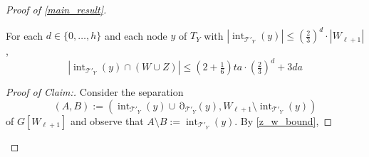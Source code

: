 \documentclass{patmorin}
\newenvironment{clmproof}{\begin{proof}[Proof of Claim:]\renewcommand{\qedsymbol}{\rule{1ex}{1ex}}}{\end{proof}}
\DeclareMathOperator{\interior}{int}
\DeclareMathOperator{\boundary}{\partial}
\begin{document}
\begin{proof}[Proof of \cref{main_result}]
  \begin{clm} \label{cell_bound}
     For each $d\in\{0,\ldots,h\}$ and
     each node $y$ of $T_Y$ with $|\interior_{\mathcal{T}'_Y}(y)|\le (\tfrac{2}{3})^d\cdot |W_{\ell+1}|$,
     \begin{equation}
       |\interior_{\mathcal{T}'_Y}(y)\cap (W\cup Z)|  \le (2+\tfrac{1}{6})ta\cdot (\tfrac{2}{3})^{d}+3da \label{t_bound}
     \end{equation}
   \end{clm}


  \begin{clmproof}
  Consider the separation
  \[
    (A,B):=(\interior_{\mathcal{T}'_Y}(y)\cup\boundary_{\mathcal{T}'_Y}(y),W_{\ell+1}\setminus\interior_{\mathcal{T}'_Y}(y))
  \]
  of $G[W_{\ell+1}]$ and observe that $A\setminus B:=\interior_{\mathcal{T}'_Y}(y)$.
  By \cref{z_w_bound},


\end{clmproof}
\end{proof}
\end{document}
